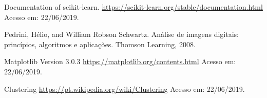 \documentclass[twoside,twocolumn]{article}
\begin{document}
\begin{thebibliography}{99} %

 Documentation of scikit-learn. \href{https://scikit-learn.org/stable/documentation.html}{https://scikit-learn.org/stable/documentation.html} Acesso em: 22/06/2019.

 Pedrini, Hélio, and William Robson Schwartz. Análise de imagens digitais: princípios, algoritmos e aplicações. Thomson Learning, 2008.

 Matplotlib Version 3.0.3 \href{https://matplotlib.org/contents.html}{https://matplotlib.org/contents.html} Acesso em: 22/06/2019.

 Clustering \href{https://pt.wikipedia.org/wiki/Clustering}{https://pt.wikipedia.org/wiki/Clustering} Acesso em: 22/06/2019.
 
\end{thebibliography}

\end{document}
